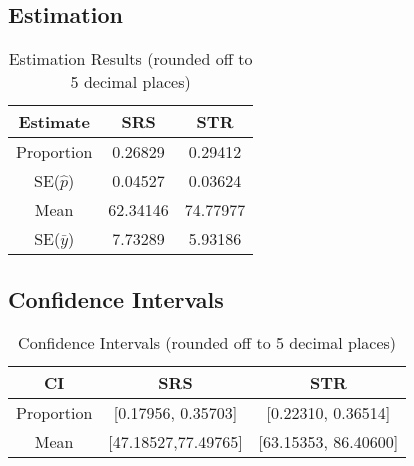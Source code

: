 \documentclass[paper=a4, fontsize=12pt,twoside]{article}	%
\begin{document}
\subsection{Estimation}
\begin{table}[H]
\caption{Estimation Results (rounded off to 5 decimal places)} %
\centering %
\begin{tabular}{c c c} %
\hline\hline %
\textbf{Estimate} & \textbf{SRS} & \textbf{STR} \\ [0.5ex] %
\hline %
Proportion & 0.26829 & 0.29412 \\ %
SE($\hat{p}$) & 0.04527 & 0.03624 \\
\hline
Mean & 62.34146 & 74.77977 \\
SE($\bar{y}$) & 7.73289 & 5.93186 \\[1ex] %
\hline %
\end{tabular}
\label{table:nonlin} %
\end{table}



\subsection{Confidence Intervals}

\begin{table}[H]
\caption{Confidence Intervals (rounded off to 5 decimal places)} %
\centering %
\begin{tabular}{c c c} %
\hline\hline %
\textbf{CI} & \textbf{SRS} & \textbf{STR} \\ [0.5ex] %
\hline %
Proportion & [0.17956, 0.35703] & [0.22310, 0.36514] \\ %
Mean & [47.18527,77.49765] & [63.15353, 86.40600] \\[1ex] %
\hline %
\end{tabular}
\label{table:nonlin} %
\end{table}
\end{document}
